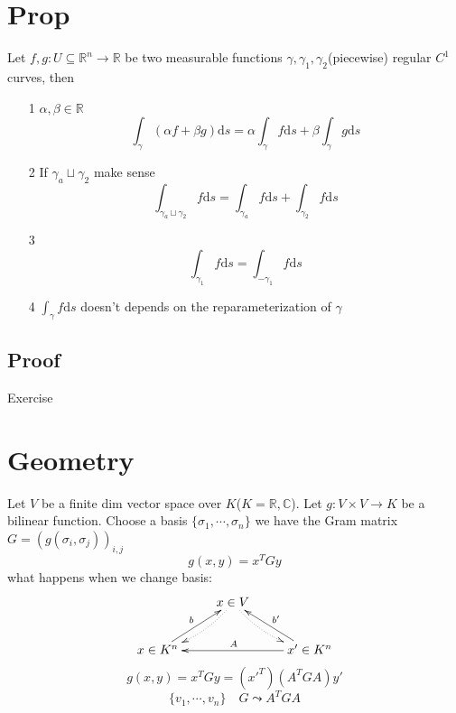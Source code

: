 \documentclass{book}
\begin{document}
\section{Prop}
Let $f,g:U\subseteq\mathbb{R}^n\rightarrow\mathbb{R}$ be two measurable functions $\gamma,\gamma_1,\gamma_2$(piecewise) regular $C^1$ curves, then
\begin{itemize}
    \item[1] $\alpha,\beta\in \mathbb{R}$$$\int_\gamma(\alpha f+\beta g)\text{d}s=\alpha\int_\gamma f\text{d}s+\beta\int_\gamma g\text{d}s$$
    \item[2] If $\gamma_a\sqcup\gamma_2$ make sense
    $$\int_{\gamma_a\sqcup\gamma_2}f\text{d}s=\int_{\gamma_a}f\text{d}s+\int_{\gamma_2}f\text{d}s$$
    \item[3]$$\int_{\gamma_1}f\text{d}s=\int_{-\gamma_1}f\text{d}s$$
    \item[4] $\int_\gamma f\text{d}s$ doesn't depends on the reparameterization of $\gamma$
\end{itemize}
\subsection*{Proof}Exercise
\section{Geometry}
Let $V$ be a finite dim vector space over $K$($K=\mathbb{R},\mathbb{C}$). Let $g:V\times V\rightarrow K$ be a bilinear function. Choose a basis $\{\sigma_1,\cdots,\sigma_n\}$ we have the Gram matrix $G=(g(\sigma_i,\sigma_j))_{i,j}$
$$g(x,y)=x^TGy$$
what happens when we change basis:
$$\xymatrix{
    &x\in V\ar@/^/@{.>}[ld]\ar@/_/@{.>}[rd]&\\
    x\in K^n\ar[ur]^b&&x'\in K^n\ar[ll]_A\ar[ul]_{b'}
}$$
$$g(x,y)=x^TGy=(x'^T)(A^TGA)y'$$
$$\{v_1,\cdots,v_n\}\quad G\leadsto A^TGA$$
\end{document}
